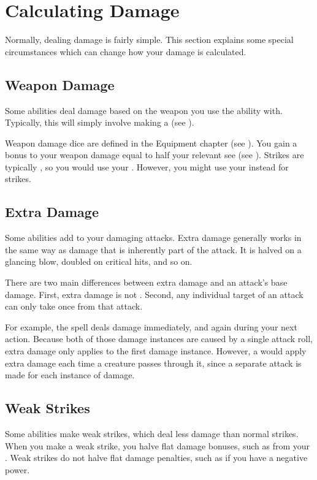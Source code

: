\section{Calculating Damage}
  Normally, dealing damage is fairly simple.
  This section explains some special circumstances which can change how your damage is calculated.

  \subsection{Weapon Damage}\label{Weapon Damage}
    Some abilities deal damage based on the weapon you use the ability with.
    Typically, this will simply involve making a  (see ).

    Weapon damage dice are defined in the Equipment chapter (see ).
    You gain a bonus to your weapon damage equal to half your relevant  see (see ).
    Strikes are typically , so you would use your .
    However, you might use your  instead for \magical strikes.

  \subsection{Extra Damage}\label{Extra Damage}
    Some abilities add  to your damaging attacks.
    Extra damage generally works in the same way as damage that is inherently part of the attack.
    It is halved on a glancing blow, doubled on critical hits, and so on.

    There are two main differences between extra damage and an attack's base damage.
    First, extra damage is not .
    Second, any individual target of an attack can only take  once from that attack.

    For example, the  spell deals damage immediately, and again during your next action.
    Because both of those damage instances are caused by a single attack roll, extra damage only applies to the first damage instance.
    However, a  would apply extra damage each time a creature passes through it, since a separate attack is made for each instance of damage.

  \subsection{Weak Strikes}
    Some abilities make weak strikes, which deal less damage than normal strikes.
    When you make a weak strike, you halve flat damage bonuses, such as from your .
    Weak strikes do not halve flat damage penalties, such as if you have a negative power.

